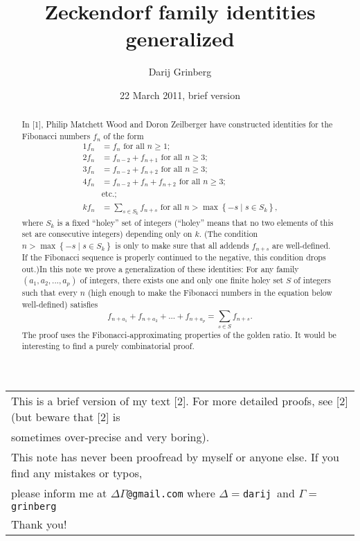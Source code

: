 \documentclass[12pt,final,notitlepage,onecolumn]{article}%
\begin{document}


\title{Zeckendorf family identities generalized}
\author{Darij Grinberg}
\date{22 March 2011, brief version}
\maketitle

\begin{abstract}
In [1], Philip Matchett Wood and Doron Zeilberger have constructed identities
for the Fibonacci numbers $f_{n}$ of the form%
\begin{align*}
1f_{n} &  =f_{n}\text{ for all }n\geq1;\\
2f_{n} &  =f_{n-2}+f_{n+1}\text{ for all }n\geq3;\\
3f_{n} &  =f_{n-2}+f_{n+2}\text{ for all }n\geq3;\\
4f_{n} &  =f_{n-2}+f_{n}+f_{n+2}\text{ for all }n\geq3;\\
&  \text{etc.;}\\
kf_{n} &  =\sum_{s\in S_{k}}f_{n+s}\text{ for all }n>\max\left\{  -s\mid s\in
S_{k}\right\}  \text{,}%
\end{align*}
where $S_{k}$ is a fixed ``holey'' set of integers (``holey'' means that no two
elements of this set are consecutive integers) depending only on $k$. (The
condition $n>\max\left\{  -s\mid s\in S_{k}\right\}  $ is only to make sure
that all addends $f_{n+s}$ are well-defined. If the Fibonacci sequence is
properly continued to the negative, this condition drops out.)\newline In this
note we prove a generalization of these identities: For any family $\left(
a_{1},a_{2},...,a_{p}\right)  $ of integers, there exists one and only one
finite holey set $S$ of integers such that every $n$ (high enough to make the
Fibonacci numbers in the equation below well-defined) satisfies
\[
f_{n+a_{1}}+f_{n+a_{2}}+...+f_{n+a_{p}}=\sum\limits_{s\in S}f_{n+s}.
\]
The proof uses the Fibonacci-approximating properties of the golden ratio.
It would be interesting to find a purely combinatorial proof.
\end{abstract}

%

\begin{tabular}
[c]{||l||}\hline\hline
This is a brief version of my text [2]. For more detailed proofs, see [2] (but
beware that [2] is\\
sometimes over-precise and very boring).\\
This note has never been proofread by myself or anyone else. If you find any
mistakes or typos,\\
please inform me at $\Delta\Gamma$\texttt{@gmail.com} where $\Delta
=$\texttt{darij }and $\Gamma=$\texttt{grinberg}\\
Thank you!\\\hline\hline
\end{tabular}
\end{document}
